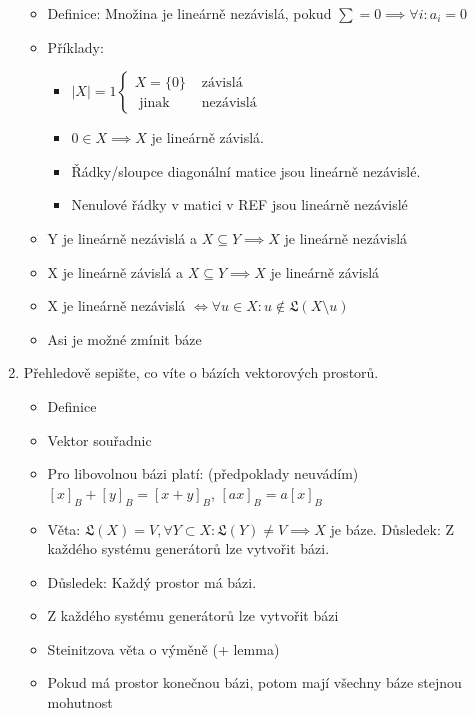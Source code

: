 \documentclass[10pt,a4paper]{article}
\begin{document}
\begin{enumerate}
\begin{itemize}[label=$\circ$]
\item Definice: Množina je lineárně nezávislá, pokud $\sum = 0 \implies \forall i: a_i = 0$
\item Příklady: \begin{itemize}
\item $|X| = 1 \begin{cases} X = \{0\} & \text{ závislá} \\ \text{ jinak} & \text{ nezávislá} \end{cases}$  
\item $0 \in X \implies X$ je lineárně závislá.
\item Řádky/sloupce diagonální matice jsou lineárně nezávislé.
\item Nenulové řádky v matici v REF jsou lineárně nezávislé
\end{itemize}
\item Y je lineárně nezávislá a $X \subseteq Y \implies X$ je lineárně nezávislá
\item X je lineárně závislá a $X \subseteq Y \implies X$ je lineárně závislá
\item  X je lineárně nezávislá $\iff \forall u \in X: u \notin \mathfrak{L}(X\setminus u)$
\item Asi je možné zmínit báze
\end{itemize}


\item Přehledově sepište, co víte o bázích vektorových prostorů. 

\begin{itemize}[label=$\circ$]
\item Definice 
\item Vektor souřadnic
\item Pro libovolnou bázi platí: (předpoklady neuvádím) $[x]_B + [y]_B = [x+y]_B$, $[a x]_B = a [x]_B$
\item Věta: $\mathfrak{L}(X) = V, \forall Y \subset X: \mathfrak{L}(Y) \neq V \implies X$ je báze. Důsledek: Z každého systému generátorů lze vytvořit bázi.
\item Důsledek: Každý prostor má bázi.
\item Z každého systému generátorů lze vytvořit bázi
\item Steinitzova věta o výměně (+ lemma)
\item Pokud má prostor konečnou bázi, potom mají všechny báze stejnou mohutnost


\end{itemize}


\end{enumerate}
\end{document}
